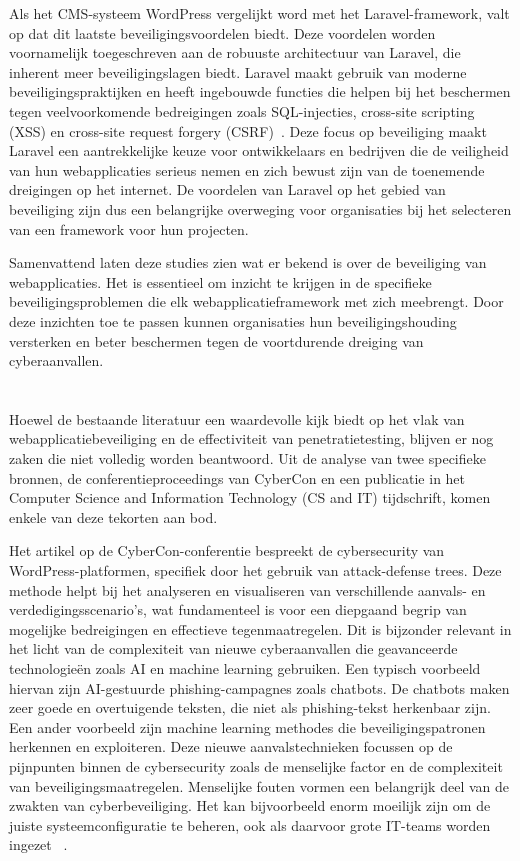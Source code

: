 Als het CMS-systeem WordPress vergelijkt word met het Laravel-framework, valt op dat dit laatste beveiligingsvoordelen biedt. Deze voordelen worden voornamelijk toegeschreven aan 
de robuuste architectuur van Laravel, die inherent meer beveiligingslagen biedt. Laravel maakt gebruik van moderne beveiligingspraktijken en heeft ingebouwde 
functies die helpen bij het beschermen tegen veelvoorkomende bedreigingen zoals SQL-injecties, cross-site scripting (XSS) en cross-site request forgery (CSRF)~\autocite{Lebedeva2023}. Deze focus 
op beveiliging maakt Laravel een aantrekkelijke keuze voor ontwikkelaars en bedrijven die de veiligheid van hun webapplicaties serieus nemen en zich bewust 
zijn van de toenemende dreigingen op het internet. De voordelen van Laravel op het gebied van beveiliging zijn dus een belangrijke overweging voor organisaties 
bij het selecteren van een framework voor hun projecten.

Samenvattend laten deze studies zien wat er bekend is over de beveiliging van webapplicaties.
Het is essentieel om inzicht te krijgen in de specifieke beveiligingsproblemen die elk webapplicatieframework met zich meebrengt. Door deze inzichten 
toe te passen kunnen organisaties hun beveiligingshouding versterken en beter beschermen tegen de voortdurende dreiging van cyberaanvallen.

\section{}
Hoewel de bestaande literatuur een waardevolle kijk biedt op het vlak van webapplicatiebeveiliging en de effectiviteit van penetratietesting, blijven er nog 
zaken die niet volledig worden beantwoord. Uit de analyse van twee specifieke bronnen, de conferentieproceedings van CyberCon en een publicatie in het 
Computer Science and Information Technology (CS and IT) tijdschrift, komen enkele van deze tekorten aan bod.

Het artikel op de CyberCon-conferentie bespreekt de cybersecurity van WordPress-platformen, specifiek door het gebruik van attack-defense trees. Deze methode helpt 
bij het analyseren en visualiseren van verschillende aanvals- en verdedigingsscenario's, wat fundamenteel is voor een diepgaand begrip van mogelijke bedreigingen en 
effectieve tegenmaatregelen. Dit is bijzonder relevant in het licht van de complexiteit van nieuwe cyberaanvallen die geavanceerde technologieën zoals AI en machine 
learning gebruiken. Een typisch voorbeeld hiervan zijn AI-gestuurde phishing-campagnes zoals chatbots. De chatbots maken zeer goede en overtuigende teksten, die niet als 
phishing-tekst herkenbaar zijn. Een ander voorbeeld zijn machine learning methodes die beveiligingspatronen herkennen en exploiteren. Deze nieuwe aanvalstechnieken
focussen op de pijnpunten binnen de cybersecurity zoals de menselijke factor en de complexiteit van beveiligingsmaatregelen. Menselijke fouten vormen een belangrijk 
deel van de zwakten van cyberbeveiliging. Het kan bijvoorbeeld enorm moeilijk zijn om de juiste systeemconfiguratie te beheren, ook als daarvoor grote IT-teams worden 
ingezet ~\autocite{Petrica2022}.

